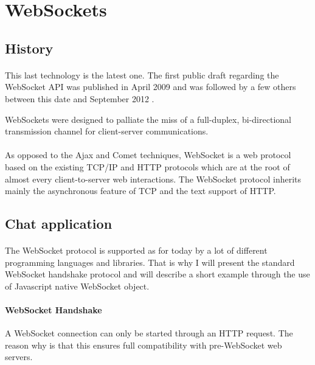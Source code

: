 \section{WebSockets}

\subsection{History}

\paragraph{} This last technology is the latest one. The first public draft 
regarding the WebSocket API was published in April 2009 and was followed by a 
few others between this date and September 2012 \cite{websocket-history}.

WebSockets were designed to palliate the miss of a full-duplex, bi-directional 
transmission channel for client-server communications.

\paragraph{} \cite{guide-html5-websocket} As opposed to the Ajax and Comet 
techniques, WebSocket is a web protocol based on the existing TCP/IP and HTTP 
protocols which are at the root of almost every client-to-server web 
interactions. The WebSocket protocol inherits mainly the asynchronous feature 
of TCP and the text support of HTTP.



\subsection{Chat application}

\paragraph{} The WebSocket protocol is supported as for today by a lot of 
different programming languages and libraries. That is why I will present 
the standard WebSocket handshake protocol and will describe a short example 
through the use of Javascript native WebSocket object.

\paragraph{WebSocket Handshake} A WebSocket connection can only be started 
through an HTTP request. The reason why is that this ensures full compatibility 
with pre-WebSocket web servers.

